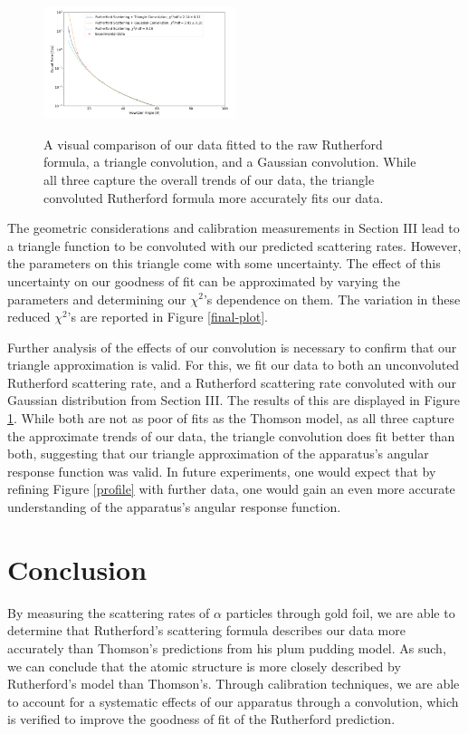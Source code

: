 \begin{figure}[h]
  \includegraphics[width=0.5\textwidth]{gaus.png}
  \label{convdata}
  \caption{A visual comparison of our data fitted to the raw Rutherford formula, a triangle convolution, and a Gaussian convolution. While all three capture the overall trends of our data, the triangle convoluted Rutherford formula more accurately fits our data.}
\end{figure}


The geometric considerations and calibration measurements in Section III lead to a triangle function to be convoluted with our predicted scattering rates. However, the parameters on this triangle come with some uncertainty. The effect of this uncertainty on our goodness of fit can be approximated by varying the parameters and determining our $\chi^2$'s dependence on them. The variation in these reduced $\chi^2$'s are reported in Figure \ref{final-plot}.


Further analysis of the effects of our convolution is necessary to confirm that our triangle approximation is valid. For this, we fit our data to both an unconvoluted Rutherford scattering rate, and a Rutherford scattering rate convoluted with our Gaussian distribution from Section III. The results of this are displayed in Figure \ref{convdata}. While both are not as poor of fits as the Thomson model, as all three capture the approximate trends of our data, the triangle convolution does fit better than both, suggesting that our triangle approximation of the apparatus's angular response function was valid. In future experiments, one would expect that by refining Figure \ref{profile} with further data, one would gain an even more accurate understanding of the apparatus's angular response function.

\section{Conclusion}
By measuring the scattering rates of $\alpha$ particles through gold foil, we are able to determine that Rutherford's scattering formula describes our data more accurately than Thomson's predictions from his plum pudding model. As such, we can conclude that the atomic structure is more closely described by Rutherford's model than Thomson's. Through calibration techniques, we are able to account for a systematic effects of our apparatus through a convolution, which is verified to improve the goodness of fit of the Rutherford prediction.

